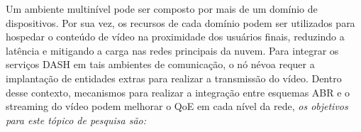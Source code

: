 Um ambiente multinível pode ser composto por mais de um domínio de dispositivos. Por sua vez, 
os recursos de cada domínio podem ser utilizados para hospedar o conteúdo de vídeo na proximidade dos usuários finais, reduzindo a latência e mitigando a carga nas redes principais da nuvem.
Para integrar os serviços DASH em tais ambientes de comunicação, o nó névoa requer a implantação de entidades extras para realizar a transmissão do vídeo.
Dentro desse contexto, 
mecanismos para realizar a integração entre esquemas ABR e o streaming do vídeo podem melhorar o QoE em cada nível da rede, \emph{os objetivos para este tópico de pesquisa são:}  





